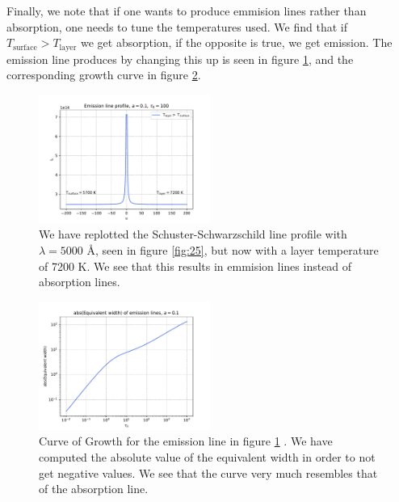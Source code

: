 \documentclass[a4paper,11.5pt,]{article}
\begin{document}
\begin{multicols}{2}
Finally, we note that if one wants to produce emmision lines rather than absorption, one needs to tune the temperatures used. We find that if $T_\text{surface} > T_\text{layer}$ we get absorption, if the opposite is true, we get emission. The emission line produces by changing this up is seen in figure \ref{fig:29}, and the corresponding growth curve in figure \ref{fig:30}. 

\begin{figure}[H]
	\centering
	\includegraphics[width=0.5\textwidth]{SSA/figures/emissionlines.pdf}
	\caption{We have replotted the Schuster-Schwarzschild line profile with $\lambda = 5000$ Å, seen in figure \ref{fig:25}, but now with a layer temperature of 7200 K. We see that this results in emmision lines instead of absorption lines.}
	\label{fig:29}
\end{figure}

\begin{figure}[H]
	\centering
	\includegraphics[width=0.5\textwidth]{SSA/figures/emissiongrowth.pdf}
	\caption{Curve of Growth for the emission line in figure \ref{fig:29} . We have computed the absolute value of the equivalent width in order to not get negative values. We see that the curve very much resembles that of the absorption line.}
	\label{fig:30}
\end{figure}

\end{multicols}
\end{document}
